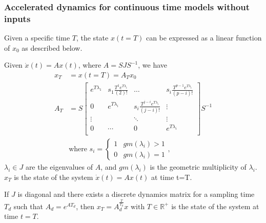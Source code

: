 \documentclass[sigconf]{llncs}
\newcommand{\mat}[1]{{#1}}
\renewcommand{\vec}[1]{{#1}}
\begin{document}
 \subsubsection{Accelerated dynamics for continuous time models without inputs}\label{sec:cont_acc_no_inputs}
 Given a specific time $T$, the state $\vec{x}(t=T)$ can be expressed as a linear function of $\vec{x}_0$ as described below.
 
 \begin{theorem}
 Given $\dot{\vec{x}}(t)=\mat{A}\vec{x}(t)$, where $\mat{A}=\mat{S}\mat{J}\mat{S}^{-1}$, we have
 \begin{align}
 \vec{x}_T&=\vec{x}(t=T)=\mat{A}_{T}\vec{x}_0\\
 \mat{A}_{T}&= \mat{S}
 \left [ \begin{array}{cccc}
 e^{T\lambda_1}  & s_1\frac{T^{1}e^{T\lambda_i}}{(2)!} & \hdots  & s_i\frac{T^{p-1}e^{T\lambda_i}}{(p-i)!} \\
0 & e^{T\lambda_i}  & s_i\frac{T^{j-i}e^{T\lambda_i}}{(j-i)!} & \vdots \\
\vdots & & \ddots & \vdots \\
0 & \cdots & 0  &e^{T\lambda_i} \\
\end{array} \right ]
 \mat{S}^{-1}
 \label{eq:continuous_tube_dyn}\\
 &\text{where } s_i=\left\{\begin{array}{cc}1&gm(\lambda_i)>1\\0&gm(\lambda_i)=1\end{array}\right.,\nonumber
 \end{align}
$\lambda_i \in \mat{J}$ are the eigenvalues of $\mat{A}$, and $gm(\lambda_i)$ is the geometric multiplicity of $\lambda_i$.  
$\vec{x}_T$ is the state of the system $\dot{\vec{x}}(t)=\mat{A}\vec{x}(t)$ at time t=T.
 \end{theorem}
  If $\mat{J}$ is diagonal and there exists a discrete dynamics matrix for a sampling time $T_d$ such that $A_d=e^{\mat{A} T_d}$, then $\vec{x}_T=A_d^{\frac{T}{T_d}}\vec{x} \text{ with } T \in \mathbb{R}^+$ is the state of the system at time $t=T$.
\end{document}
